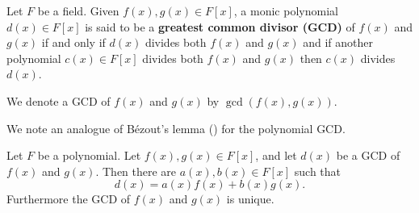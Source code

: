 \begin{definition}
    Let $F$ be a field. Given $f(x), g(x) \in F[x]$, a monic polynomial $d(x) \in F[x]$ is said to be a \textbf{greatest common divisor (GCD)} of $f(x)$ and $g(x)$ if and only if $d(x)$ divides both $f(x)$ and $g(x)$ and if another polynomial $c(x) \in F[x]$ divides both $f(x)$ and $g(x)$ then $c(x)$ divides $d(x)$.

    We denote a GCD of $f(x)$ and $g(x)$ by $\gcd(f(x), g(x))$.
\end{definition}

We note an analogue of B\'ezout's lemma () for the polynomial GCD.

\begin{theorem}\label{thrm-bezout-lemma-for-polynomials}
    Let $F$ be a polynomial. Let $f(x), g(x) \in F[x]$, and let $d(x)$ be a GCD of $f(x)$ and $g(x)$. Then there are $a(x), b(x) \in F[x]$ such that
    \[
        d(x) = a(x)f(x) + b(x)g(x).
    \]
    Furthermore the GCD of $f(x)$ and $g(x)$ is unique.
\end{theorem}

